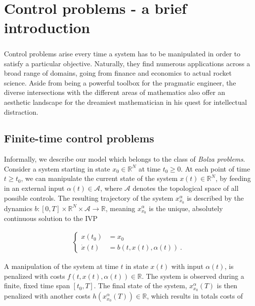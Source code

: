 \chapter{Control problems - a brief introduction} 

	\paragraph{}
	Control problems arise every time a system has to be manipulated in order to satisfy a particular objective. Naturally, they find numerous applications across a broad range of domains, going from finance and economics to actual rocket science. Aside from being a powerful toolbox for the pragmatic engineer, the diverse intersections with the different areas of mathematics also offer an aesthetic landscape for the dreamiest mathematician in his quest for intellectual distraction. 
	
	\section{Finite-time control problems}
	
	Informally, we describe our model which belongs to the class of \emph{Bolza problems}. Consider a system starting in state $ x_0 \in \mathbb{R}^N $ at time $ t_0 \geq 0 $. At each point of time $ t \geq t_0 $, we can manipulate the current state of the system $ x(t) \in \mathbb{R}^N $, by feeding in an external input $ \alpha(t) \in \mathcal{A} $, where $ \mathcal{A} $ denotes the topological space of all possible controls. The resulting trajectory of the system $ x^{\alpha}_{x_0} $ is described by the dynamics $ b : \left[ 0 , T \right] \times \mathbb{R}^N \times \mathcal{A} \to \mathbb{R} $, meaning $ x^{\alpha}_{x_0} $ is the unique, absolutely continuous solution to the IVP
	
	\begin{align*}
	\begin{cases}
	x(t_0) &= x_0 \\
	\dot{x}(t) &= b(t, x(t), \alpha(t)) \ .
	\end{cases}
	\end{align*}
	
	A manipulation of the system at time $ t $ in state $ x(t) $ with input $ \alpha(t) $, is penalized with costs $ f(t, x(t), \alpha(t)) \in \mathbb{R} $. The system is observed during a finite, fixed time span $ \left[t_0, T \right] $. The final state of the system, $ x^{\alpha}_{x_0}(T) $ is then penalized with another costs $ h(x^{\alpha}_{x_0}(T)) \in \mathbb{R} $, which results in totals costs of
	
